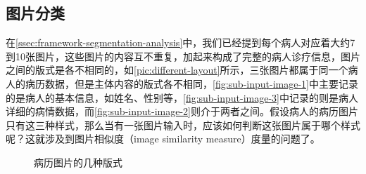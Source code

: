 \subsection{图片分类}
在\autoref{ssec:framework-segmentation-analysis}中，我们已经提到每个病人对应着大约7到10张图片，这些图片的内容互不重复，加起来构成了完整的病人诊疗信息，图片之间的版式是各不相同的，如\autoref{pic:different-layout}所示，三张图片都属于同一个病人的病历数据，但是主体内容的版式各不相同，\autoref{fig:sub-input-image-1}中主要记录的是病人的基本信息，如姓名、性别等，\autoref{fig:sub-input-image-3}中记录的则是病人详细的病情数据，而\autoref{fig:sub-input-image-2}则介于两者之间。假设病人的病历图片只有这三种样式，那么当有一张图片输入时，应该如何判断这张图片属于哪个样式呢？这就涉及到图片相似度（image similarity measure）度量的问题了。

\begin{figure}[htbp]
  \centering
  \caption{病历图片的几种版式}
  \label{pic:different-layout}
\end{figure}

